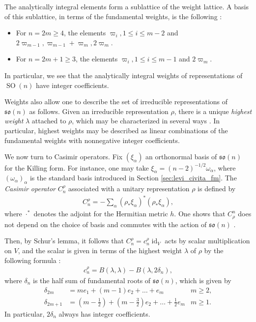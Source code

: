 \documentclass[12pt]{amsart}
\numberwithin{numbering}{section}
\theoremstyle{plain}
\theoremstyle{definition}
\theoremstyle{remark}
\numberwithin{equation}{section}
\DeclareMathOperator{\identity}{id}
\DeclareMathOperator{\SO}{SO}
\newcommand{\frk}[1]{\mathfrak{#1}}
\begin{document}
The analytically integral elements form a sublattice of the weight lattice. A basis of this sublattice, in terms of the fundamental weights, is the following \cite[Proposition 3.1.19]{goodman2009representations}: 
\begin{itemize}
\item For $n = 2m \geq 4$, the elements $\varpi_i, 1 \leq i \leq m-2$ and $2 \varpi_{m-1}, \varpi_{m-1} + \varpi_m, 2 \varpi_m$. 
\item For $n = 2m+1 \geq 3$, the elements $\varpi_i, 1 \leq i \leq m-1$ and $2 \varpi_m$.
\end{itemize}
In particular, we see that the analytically integral weights of representations of $\SO(n)$ have integer coefficients.

\medskip

Weights also allow one to describe the set of irreducible representations of $\frk{so}(n)$ as follows. Given an irreducible representation $\rho$, there is a unique \emph{highest weight} $\lambda$ attached to $\rho$, which may be characterized in several ways \cite[Section 5.2]{knapp1996lie}. In particular, highest weights may be described as linear combinations of the fundamental weights with nonnegative integer coefficients.

\medskip 

We now turn to Casimir operators. Fix $(\xi_\alpha)$ an orthonormal basis of $\frk{so}(n)$ for the Killing form. For instance, one may take $\xi_\alpha = (n-2)^{-1/2} \omega_\alpha$, where $(\omega_\alpha)_\alpha$ is the standard basis introduced in Section \ref{sec:levi_civita_fm}. The \emph{Casimir operator} $C_n^\rho$ associated with a unitary representation $\rho$ is defined by 
\begin{align*}
C_n^\rho = - \sum_\alpha (\rho_* \xi_\alpha)^* (\rho_* \xi_\alpha),
\end{align*}
where $\cdot^*$ denotes the adjoint for the Hermitian metric $h$. One shows that $C^n_\rho$ does not depend on the choice of basis and commutes with the action of $\frk{so}(n)$ \cite[Proposition 5.24]{knapp1996lie}.

Then, by Schur's lemma, it follows that $C_n^\rho = c_n^\rho \identity_V$ acts by scalar multiplication on $V$, and the scalar is given in terms of the highest weight $\lambda$ of $\rho$ by the following formula \cite[Proposition 5.28]{knapp1996lie}:
\begin{align} \label{eq:casimir_scalar}
c_n^\rho = B(\lambda, \lambda) - B(\lambda, 2 \delta_n),
\end{align}
where $\delta_n$ is the half sum of fundamental roots of $\frk{so}(n)$, which is given by
\begin{align} \label{eq:half_sum}
   \delta_{2m} &= m e_1 + (m-1) e_2 + \ldots + e_m & m \geq 2, \\ 
   \delta_{2m+1} &= \left ( m- \frac{1}{2} \right ) + \left ( m - \frac{3}{2} \right ) e_2 + \ldots + \frac{1}{2} e_m & m \geq 1.
\end{align}
In particular, $2 \delta_n$ always has integer coefficients.
\end{document}
